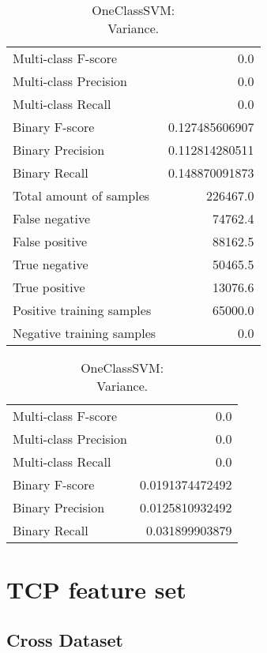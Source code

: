 \begin{table}[H]
\begin{minipage}{0.5\textwidth}
\caption{OneClassSVM: \\Average.}
\centering
\begin{tabular}{l r}
\toprule
Multi-class F-score & 0.0 \\
Multi-class Precision & 0.0 \\
Multi-class Recall & 0.0 \\
\midrule
Binary F-score & 0.127485606907 \\
Binary Precision & 0.112814280511 \\
Binary Recall & 0.148870091873 \\
\midrule
Total amount of samples & 226467.0 \\
False negative & 74762.4 \\
False positive & 88162.5 \\
True negative & 50465.5 \\
True positive & 13076.6 \\
\midrule
Positive training samples & 65000.0 \\
Negative training samples & 0.0 \\
\bottomrule
\end{tabular}
\end{minipage}
\hfillx
\begin{minipage}{0.5\textwidth}
\caption{OneClassSVM: \\Variance.}
\centering
\begin{tabular}{l r}
\toprule
Multi-class F-score & 0.0 \\
Multi-class Precision & 0.0 \\
Multi-class Recall & 0.0 \\
\midrule
Binary F-score & 0.0191374472492 \\
Binary Precision & 0.0125810932492 \\
Binary Recall & 0.031899903879 \\
\bottomrule
\end{tabular}
\end{minipage}
\end{table}

\newpage
\section{TCP feature set}
\subsection{Cross Dataset}

